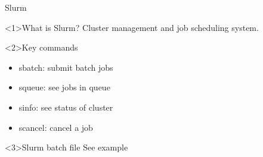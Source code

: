 \documentclass[t]{beamer}
\begin{document}
\begin{frame}{Slurm}
    \begin{block}<1>{What is Slurm?}
        Cluster management and job scheduling system.
    \end{block}

    \begin{block}<2>{Key commands}
        \begin{itemize}
            \item sbatch: submit batch jobs
            \item squeue: see jobs in queue
            \item sinfo: see status of cluster
            \item scancel: cancel a job
        \end{itemize}
    \end{block}

    \begin{block}<3>{Slurm batch file}
        See example
    \end{block}
\end{frame}
\end{document}
